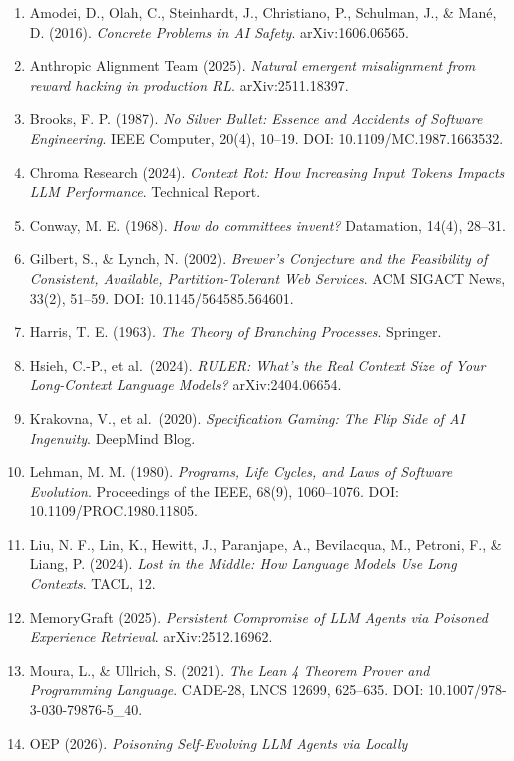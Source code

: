 \documentclass[
]{ctexart}
\providecommand{\tightlist}{%
  \setlength{\itemsep}{0pt}\setlength{\parskip}{0pt}}
\begin{document}
\begin{enumerate}
\def\labelenumi{\arabic{enumi}.}
\tightlist
\item
  Amodei, D., Olah, C., Steinhardt, J., Christiano, P., Schulman, J., \&
  Mané, D. (2016). \emph{Concrete Problems in AI Safety}.
  arXiv:1606.06565.
\item
  Anthropic Alignment Team (2025). \emph{Natural emergent misalignment
  from reward hacking in production RL}. arXiv:2511.18397.
\item
  Brooks, F. P. (1987). \emph{No Silver Bullet: Essence and Accidents of
  Software Engineering}. IEEE Computer, 20(4), 10--19. DOI:
  10.1109/MC.1987.1663532.
\item
  Chroma Research (2024). \emph{Context Rot: How Increasing Input Tokens
  Impacts LLM Performance}. Technical Report.
\item
  Conway, M. E. (1968). \emph{How do committees invent?} Datamation,
  14(4), 28--31.
\item
  Gilbert, S., \& Lynch, N. (2002). \emph{Brewer's Conjecture and the
  Feasibility of Consistent, Available, Partition-Tolerant Web
  Services}. ACM SIGACT News, 33(2), 51--59. DOI: 10.1145/564585.564601.
\item
  Harris, T. E. (1963). \emph{The Theory of Branching Processes}.
  Springer.
\item
  Hsieh, C.-P., et al.~(2024). \emph{RULER: What's the Real Context Size
  of Your Long-Context Language Models?} arXiv:2404.06654.
\item
  Krakovna, V., et al.~(2020). \emph{Specification Gaming: The Flip Side
  of AI Ingenuity}. DeepMind Blog.
\item
  Lehman, M. M. (1980). \emph{Programs, Life Cycles, and Laws of
  Software Evolution}. Proceedings of the IEEE, 68(9), 1060--1076. DOI:
  10.1109/PROC.1980.11805.
\item
  Liu, N. F., Lin, K., Hewitt, J., Paranjape, A., Bevilacqua, M.,
  Petroni, F., \& Liang, P. (2024). \emph{Lost in the Middle: How
  Language Models Use Long Contexts}. TACL, 12.
\item
  MemoryGraft (2025). \emph{Persistent Compromise of LLM Agents via
  Poisoned Experience Retrieval}. arXiv:2512.16962.
\item
  Moura, L., \& Ullrich, S. (2021). \emph{The Lean 4 Theorem Prover and
  Programming Language}. CADE-28, LNCS 12699, 625--635. DOI:
  10.1007/978-3-030-79876-5\_40.
\item
  OEP (2026). \emph{Poisoning Self-Evolving LLM Agents via Locally
}
\end{enumerate}
\end{document}
